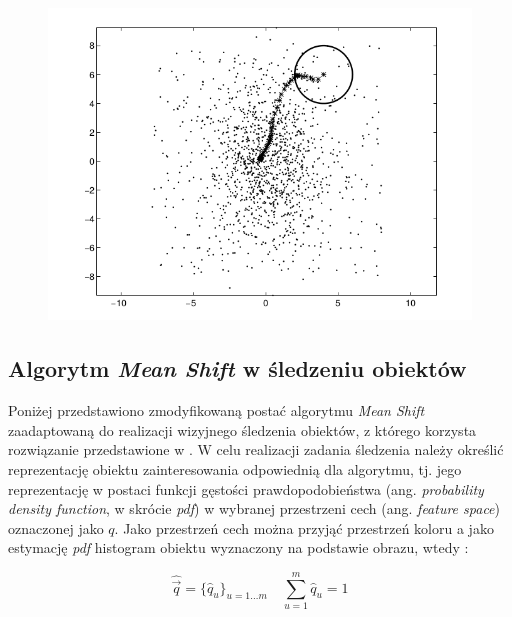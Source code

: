 \begin{figure}[!htb]
	\begin{center}
		\includegraphics[width=12cm]{images/mean_shift_example.png}
	\end{center}	
\label{fig:Mean_Shift_przyklad}
\end{figure}

\subsection{Algorytm \textit{Mean Shift} w śledzeniu obiektów}
\label{subsec:Algorytm_Mean_Shift_w_sledzeniu_obiektow}

Poniżej przedstawiono zmodyfikowaną postać algorytmu \textit{Mean Shift} zaadaptowaną do realizacji wizyjnego śledzenia obiektów, z którego korzysta rozwiązanie przedstawione w \cite{Liem2008}.
W celu realizacji zadania śledzenia należy określić reprezentację obiektu zainteresowania odpowiednią dla algorytmu, tj. jego reprezentację w postaci funkcji gęstości prawdopodobieństwa (ang. \textit{probability density function}, w skrócie \textit{pdf}) w wybranej przestrzeni cech (ang. \textit{feature space}) oznaczonej jako $q$. Jako przestrzeń cech można przyjąć przestrzeń koloru a jako estymację \textit{pdf} histogram obiektu wyznaczony na podstawie obrazu, wtedy  \cite{Comaniciu2003}:

\begin{equation}
\label{equ:Mean_Shift_reprezentacja_obiektu}
	\hat{\vec{q}} = \{\hat{q}_u\}_{u = 1 \dots m} \quad \sum_{u = 1}^{m} \hat{q}_u = 1
\end{equation}

